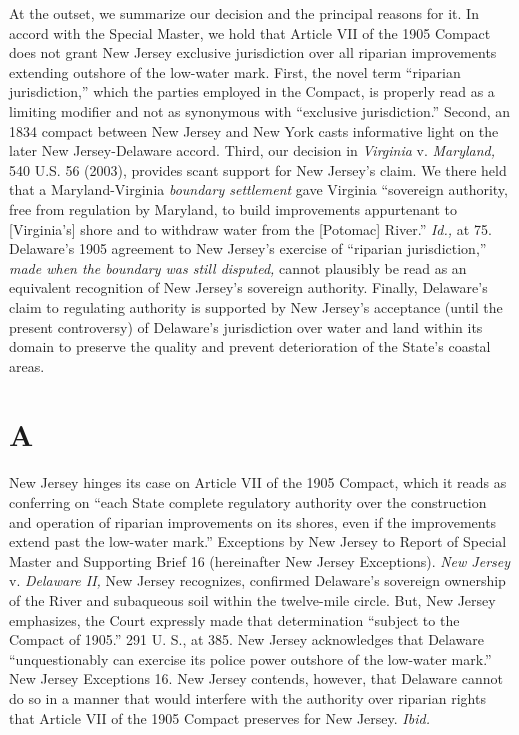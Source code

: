 {  At the outset, we summarize our decision and the principal reasons
for it. In accord with the Special Master, we hold that Article VII of
the 1905 Compact does not grant New Jersey exclusive jurisdiction over
all riparian improvements extending outshore of the low-water mark.
First, the novel term ``riparian jurisdiction,'' which the parties
employed in the Compact, is properly read as a limiting modifier
and not as synonymous with ``exclusive jurisdiction.'' Second,
an 1834 compact between New Jersey and New York casts informative
light on the later New Jersey-Delaware accord. Third, our decision in
\emph{Virginia} v. \emph{Maryland,} 540 U.S. 56 (2003), provides scant
support for New Jersey's claim. We there held that a Maryland-Virginia
\emph{boundary settlement} gave Virginia ``sovereign authority, free
from regulation by Maryland, to build improvements appurtenant to
[Virginia's] shore and to withdraw water from the [Potomac] River.''
\emph{Id.,} at 75. Delaware's 1905 agreement to New Jersey's
exercise of ``riparian jurisdiction,'' \emph{made when the boundary was
still disputed,} cannot plausibly be read as an equivalent recognition
of New Jersey's sovereign authority. Finally, Delaware's claim to
regulating authority is supported by New Jersey's acceptance (until
the present controversy) of Delaware's jurisdiction over water and
land within its domain to preserve the quality and prevent deterioration
of the State's coastal areas.

\section{A}

  New Jersey hinges its case on Article VII of the 1905 Compact, which
it reads as conferring on ``each State complete regulatory authority
over the construction and operation of riparian improvements on its
shores, even if the improvements extend past the low-water mark.''
Exceptions by New Jersey to Report of Special Master and Supporting
Brief 16 (hereinafter New Jersey Exceptions). \emph{New Jersey} \newpage  v.
\emph{Delaware II,} New Jersey recognizes, confirmed Delaware's sovereign
ownership of the River and subaqueous soil within the twelve-mile
circle. But, New Jersey emphasizes, the Court expressly made that
determination ``subject to the Compact of 1905.'' 291 U. S., at
385. New Jersey acknowledges that Delaware ``unquestionably can
exercise its police power outshore of the low-water mark.'' New Jersey
Exceptions 16. New Jersey contends, however, that Delaware cannot do
so in a manner that would interfere with the authority over riparian
rights that Article VII of the 1905 Compact preserves for New Jersey.
\emph{Ibid.}

}
